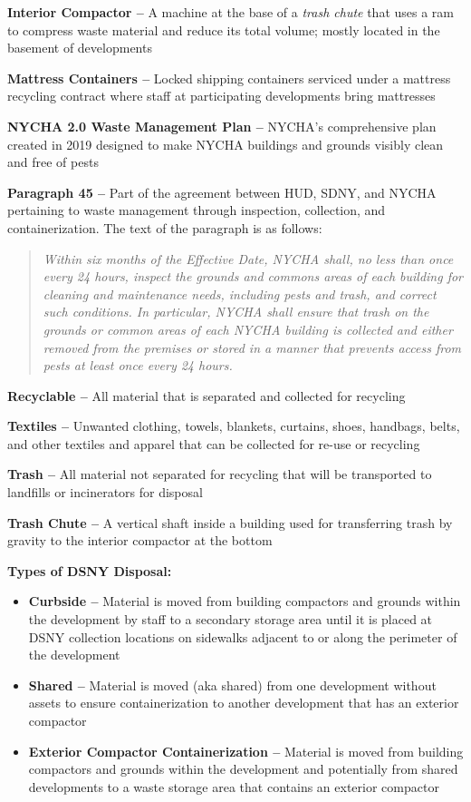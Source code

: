 \textbf{Interior Compactor --} A machine at the base of a \textit{trash chute} that uses a ram to compress waste material and reduce its total volume; mostly located in the basement of developments

\textbf{Mattress Containers --} Locked shipping containers serviced under a mattress recycling contract where staff at participating developments bring mattresses

\textbf{NYCHA 2.0 Waste Management Plan --} NYCHA's comprehensive plan created in 2019 designed to make NYCHA buildings and grounds visibly clean and free of pests

\textbf{Paragraph 45 --} Part of the agreement between HUD, SDNY, and NYCHA pertaining to waste management through inspection, collection, and containerization. The text of the paragraph is as follows:
\begin{quotation}
\small\textit{Within six months of the Effective Date, NYCHA shall, no less than once every 24 hours, inspect the grounds and commons areas of each building for cleaning and maintenance needs, including pests and trash, and correct such conditions. In particular, NYCHA shall ensure that trash on the grounds or common areas of each NYCHA building is collected and either removed from the premises or stored in a manner that prevents access from pests at least once every 24 hours.}
\end{quotation}

\textbf{Recyclable --} All material that is separated and collected for recycling

\textbf{Textiles --} Unwanted clothing, towels, blankets, curtains, shoes, handbags, belts, and other textiles and apparel that can be collected for re-use or recycling

\textbf{Trash --} All material not separated for recycling that will be transported to landfills or incinerators for disposal

\textbf{Trash Chute --} A vertical shaft inside a building used for transferring trash by gravity to the interior compactor at the bottom

\textbf{Types of DSNY Disposal:}
\begin{itemize}
\setlength{\itemsep}{0pt}%
    \setlength{\parsep}{0pt}%
    \setlength{\parskip}{0pt}%
\item \textbf{Curbside --} Material is moved from building compactors and grounds within the development by staff to a secondary storage area until it is placed at DSNY collection locations on sidewalks adjacent to or along the perimeter of the development
\item \textbf{Shared --} Material is moved (aka shared) from one development without assets to ensure containerization to another development that has an exterior compactor
\item \textbf{Exterior Compactor Containerization --} Material is moved from building compactors and grounds within the development and potentially from shared developments to a waste storage area that contains an exterior compactor
\end{itemize}

